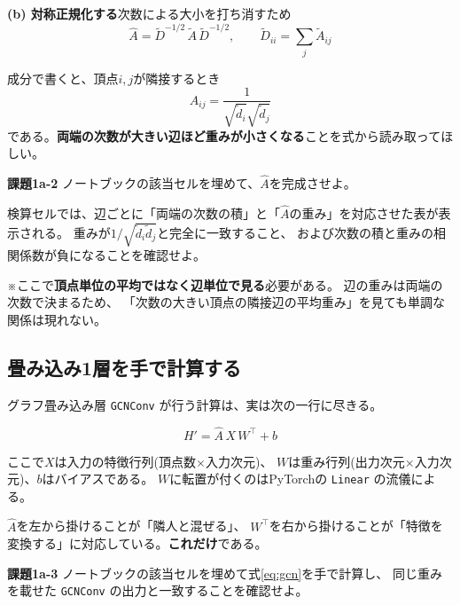 \documentclass[11pt,a4paper]{jsarticle}
\begin{document}
\noindent
\textbf{(b) 対称正規化する}\quad 次数による大小を打ち消すため
\begin{equation}
\hat{A} = \tilde{D}^{-1/2}\,\tilde{A}\,\tilde{D}^{-1/2},
\qquad \tilde{D}_{ii}=\sum_{j}\tilde{A}_{ij}
\end{equation}

\noindent
成分で書くと、頂点$i,j$が隣接するとき
\begin{equation}
\hat{A}_{ij}=\frac{1}{\sqrt{\tilde{d}_i}\sqrt{\tilde{d}_j}}
\end{equation}
である。\textbf{両端の次数が大きい辺ほど重みが小さくなる}ことを式から読み取ってほしい。

\begin{screen}
\textbf{課題1a-2} \quad ノートブックの該当セルを埋めて、$\hat{A}$を完成させよ。
\end{screen}

\noindent
検算セルでは、辺ごとに「両端の次数の積」と「$\hat{A}$の重み」を対応させた表が表示される。
重みが$1/\sqrt{\tilde{d}_i\tilde{d}_j}$と完全に一致すること、
および次数の積と重みの相関係数が負になることを確認せよ。

\medskip
\noindent
※ここで\textbf{頂点単位の平均ではなく辺単位で見る}必要がある。
辺の重みは両端の次数で決まるため、
「次数の大きい頂点の隣接辺の平均重み」を見ても単調な関係は現れない。

\subsection{畳み込み1層を手で計算する}

グラフ畳み込み層 \verb|GCNConv| が行う計算は、実は次の一行に尽きる。

\begin{equation}\label{eq:gcn}
H' = \hat{A}\,X\,W^{\top} + b
\end{equation}

\noindent
ここで$X$は入力の特徴行列(頂点数$\times$入力次元)、
$W$は重み行列(出力次元$\times$入力次元)、$b$はバイアスである。
$W$に転置が付くのはPyTorchの \verb|Linear| の流儀による。

$\hat{A}$を左から掛けることが「隣人と混ぜる」、
$W^{\top}$を右から掛けることが「特徴を変換する」に対応している。\textbf{これだけ}である。

\begin{screen}
\textbf{課題1a-3} \quad ノートブックの該当セルを埋めて式\eqref{eq:gcn}を手で計算し、
同じ重みを載せた \verb|GCNConv| の出力と一致することを確認せよ。
\end{screen}
\end{document}
